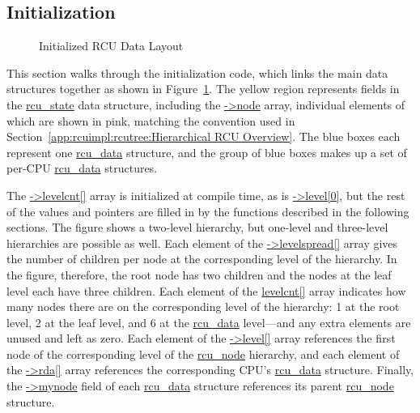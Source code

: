 \subsection{Initialization}
\label{app:rcuimpl:rcutreewt:Initialization}

\begin{figure}[tb]
\begin{center}
\end{center}
\caption{Initialized RCU Data Layout}
\label{fig:app:rcuimpl:rcutree:Initialized RCU Data Layout}
\end{figure}

This section walks through the initialization code, which links the
main data structures together as shown in
Figure~\ref{fig:app:rcuimpl:rcutree:Initialized RCU Data Layout}.
The yellow region represents fields in the \url{rcu_state} data
structure, including the \url{->node} array, individual elements
of which are shown in pink, matching the convention used in
Section~\ref{app:rcuimpl:rcutree:Hierarchical RCU Overview}.
The blue boxes each represent one \url{rcu_data} structure,
and the group of blue boxes makes up a set of per-CPU \url{rcu_data}
structures.

The \url{->levelcnt[]} array is initialized at compile time, as is
\url{->level[0]}, but the rest of the values and pointers are filled
in by the functions described in the following sections.
The figure shows a two-level hierarchy, but one-level and three-level
hierarchies are possible as well.
Each element of the \url{->levelspread[]} array gives the number of
children per node at the corresponding level of the hierarchy.
In the figure, therefore, the root node has two children and the
nodes at the leaf level each have three children.
Each element of the \url{levelcnt[]} array indicates how many nodes
there are on the corresponding level of the hierarchy: 1 at the root
level, 2 at the leaf level, and 6 at the \url{rcu_data} level---and any
extra elements are unused and left as zero.
Each element of the \url{->level[]} array references the first
node of the corresponding level of the \url{rcu_node} hierarchy,
and each element of the \url{->rda[]} array references the corresponding
CPU's \url{rcu_data} structure.
Finally, the \url{->mynode} field of each \url{rcu_data} structure
references its parent \url{rcu_node} structure.

